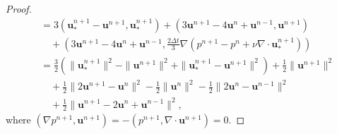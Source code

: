 \documentclass[10pt,a4paper]{amsart}
\newcommand{\uu}{\mathrm{\textbf{u}}}
\begin{document}
\begin{proof}
{\begin{align}
&=3\left(\uu_*^{n+1}-\uu^{n+1},\uu_*^{n+1}\right)+
\left(3\uu^{n+1}-4\uu^{n}+\uu^{n-1},\uu^{n+1}\right)\nonumber\\
&\quad+\left(3\uu^{n+1}-4\uu^{n}+\uu^{n-1},\frac{2\Delta t}{3}\nabla\left(p^{n+1}-p^n+\nu\nabla\cdot\uu_*^{n+1}\right)\right)\nonumber\\
&=\frac{3}{2}\left(\|\uu_*^{n+1}\|^2-\|\uu^{n+1}\|^2+\|\uu_*^{n+1}-\uu^{n+1}\|^2\right)+\frac{1}{2}\|\uu^{n+1}\|^2\nonumber\\
&\quad+\frac{1}{2}\|2\uu^{n+1}-\uu^n\|^2
-\frac{1}{2}\|\uu^n\|^2-\frac{1}{2}\|2\uu^{n}-\uu^{n-1}\|^2\nonumber\\
&\quad+\frac{1}{2}\|\uu^{n+1}-2\uu^n+\uu^{n-1}\|^2,
\end{align}}
where $\left(\nabla p^{n+1},\uu^{n+1}\right)=-\left(p^{n+1},\nabla\cdot\uu^{n+1}\right)=0$.


\end{proof}
\end{document}
